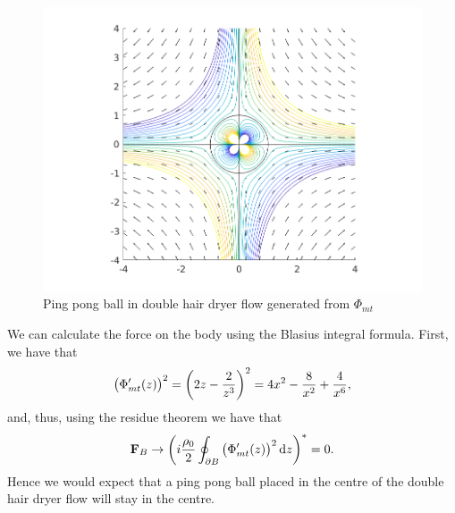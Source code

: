 \documentclass{article}
\def\*#1{\mathbf{#1}}
\begin{document}
\begin{figure}[ht]
    \includegraphics[width=35em]{mt_ex2_2}
    \centering
    \caption{Ping pong ball in double hair dryer flow generated from $\Phi_{mt}$}
    \label{fig:mt-4}
\end{figure}
%
We can calculate the force on the body using the Blasius integral
formula. First, we have that
%
\begin{equation*}
    \del{\Phi_{mt}^\prime(z)}^2
        = \del{2 z - \frac{2}{z^3}}^2
        = 4 x^2 - \frac{8}{x^2} + \frac{4}{x^6}
        ,
\end{equation*}
%
and, thus, using the residue theorem we have that
%
\begin{equation*}
    \*F_B \to \del{i \frac{\rho_0}{2} \oint_{\partial B} \del{\Phi_{mt}^\prime(z)}^2 \dif z}^* = 0
    .
\end{equation*}
%
Hence we would expect that a ping pong ball placed in the centre of the
double hair dryer flow will stay in the centre.
\end{document}
